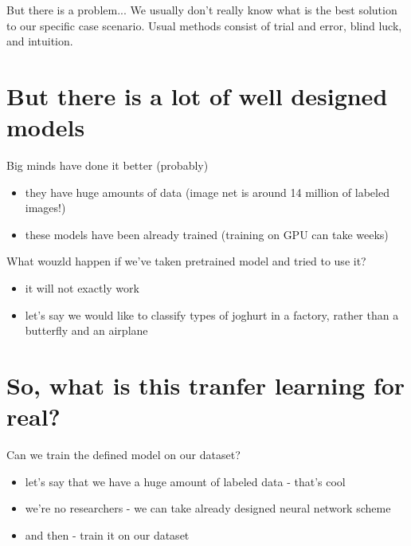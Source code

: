 \documentclass[aspectratio=1610,english]{beamer} %
\begin{document}
	\begin{frame}{But there is a problem...}
		We usually don't really know what is the best solution to our specific case scenario.
		\newline
		\newline
		Usual methods consist of trial and error, blind luck, and intuition.
	
	 \end{frame}
 
 	\section{But there is a lot of well designed models}
	\begin{frame}{Big minds have done it better (probably)}
		 \begin{itemize}
		 	\item they have huge amounts of data (image net is around 14 million of labeled images!)
		 	\item these models have been already trained (training on GPU can take weeks)
		 \end{itemize}
	\end{frame}

 	\begin{frame}{What wouzld happen if we've taken pretrained model and tried to use it?}
		 \begin{itemize}
		 	\item it will not exactly work
		 	\item let's say we would like to classify types of joghurt in a factory, rather than a butterfly and an airplane
		 \end{itemize}
	\end{frame}

\section{So, what is this tranfer learning for real?}
 	\begin{frame}{Can we train the defined model on our dataset?}
		\begin{itemize}
			\item let's say that we have a huge amount of labeled data - that's cool
			\item we're no researchers - we can take already designed neural network scheme
			\item and then - train it on our dataset
		\end{itemize}
	\end{frame}
 
\end{document}
